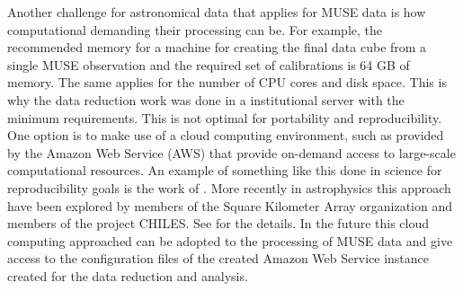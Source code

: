 Another challenge for astronomical data that applies for MUSE data is how computational demanding their processing can be. For example, the recommended memory for a machine for creating the final data cube from a single MUSE observation and the required set of calibrations is 64 GB of memory. The same applies for the number of CPU cores and disk space. This is why the data reduction work was done in a institutional server with the minimum requirements. This is not optimal for portability and reproducibility. One option is to make use of a cloud computing environment, such as provided by the Amazon Web Service (AWS) that provide on-demand access to large-scale computational resources. An example of something like this done in science for reproducibility goals is the work of \cite{ragan-kelley_collaborative_2013}. More recently in astrophysics this approach have been explored by members of the Square Kilometer Array organization and members of the project CHILES. See \cite{Dodson_SKAAmazon_2016} for the details. In the future this cloud computing approached can be adopted to the processing of MUSE data and give access to the configuration files of the created Amazon Web Service instance created for the data reduction and analysis.  

